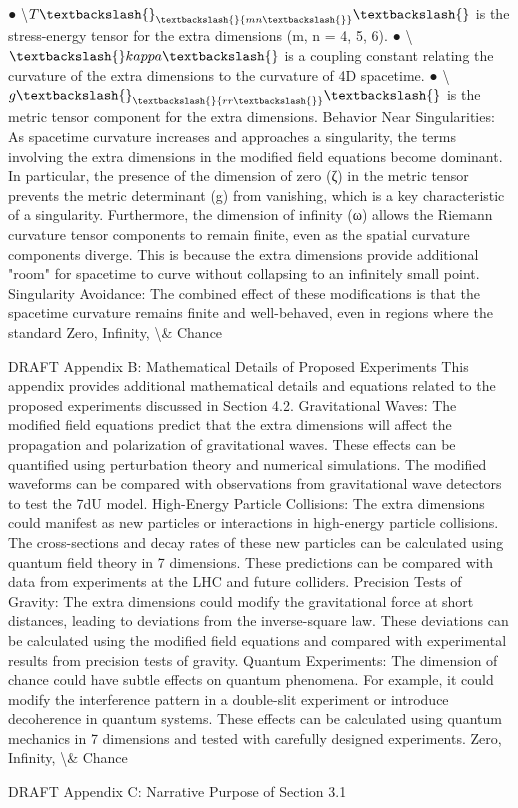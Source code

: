 \documentclass[12pt]{article}
\begin{document}
●
\textbackslash{}$T\textbackslash{}_\textbackslash{}{mn\textbackslash{}}\textbackslash{}$ is the stress-energy tensor for the extra dimensions (m, n = 4, 5, 6).
●
\textbackslash{}$\textbackslash{}kappa\textbackslash{}$ is a coupling constant relating the curvature of the extra dimensions to the
curvature of 4D spacetime.
●
\textbackslash{}$g\textbackslash{}_\textbackslash{}{rr\textbackslash{}}\textbackslash{}$ is the metric tensor component for the extra dimensions.
Behavior Near Singularities:
As spacetime curvature increases and approaches a singularity, the terms involving the
extra dimensions in the modiﬁed ﬁeld equations become dominant. In particular, the
presence of the dimension of zero (ζ) in the metric tensor prevents the metric determinant
(g) from vanishing, which is a key characteristic of a singularity.
Furthermore, the dimension of inﬁnity (ω) allows the Riemann curvature tensor
components to remain ﬁnite, even as the spatial curvature components diverge. This is
because the extra dimensions provide additional "room" for spacetime to curve without
collapsing to an inﬁnitely small point.
Singularity Avoidance:
The combined eﬀect of these modiﬁcations is that the spacetime curvature remains ﬁnite
and well-behaved, even in regions where the standard
Zero, Infinity, \textbackslash{}& Chance

DRAFT
Appendix B: Mathematical Details of Proposed Experiments
This appendix provides additional mathematical details and equations related to the
proposed experiments discussed in Section 4.2.
Gravitational Waves:
The modiﬁed ﬁeld equations predict that the extra dimensions will aﬀect the propagation
and polarization of gravitational waves. These eﬀects can be quantiﬁed using
perturbation theory and numerical simulations. The modiﬁed waveforms can be
compared with observations from gravitational wave detectors to test the 7dU model.
High-Energy Particle Collisions:
The extra dimensions could manifest as new particles or interactions in high-energy
particle collisions. The cross-sections and decay rates of these new particles can be
calculated using quantum ﬁeld theory in 7 dimensions. These predictions can be
compared with data from experiments at the LHC and future colliders.
Precision Tests of Gravity:
The extra dimensions could modify the gravitational force at short distances, leading to
deviations from the inverse-square law. These deviations can be calculated using the
modiﬁed ﬁeld equations and compared with experimental results from precision tests of
gravity.
Quantum Experiments:
The dimension of chance could have subtle eﬀects on quantum phenomena. For
example, it could modify the interference pattern in a double-slit experiment or introduce
decoherence in quantum systems. These eﬀects can be calculated using quantum
mechanics in 7 dimensions and tested with carefully designed experiments.
Zero, Infinity, \textbackslash{}& Chance

DRAFT
Appendix C: Narrative Purpose of Section 3.1
\end{document}
